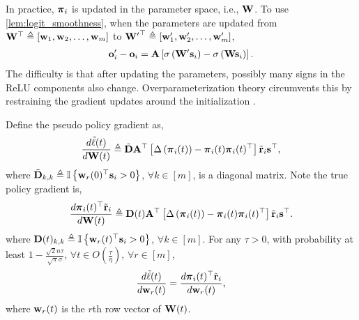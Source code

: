 In practice, ${\boldsymbol{\pi}}_i$ is updated in the parameter space, i.e., ${\mathbf{W}}$. To use \cref{lem:logit_smoothness}, when the parameters are updated from ${\mathbf{W}}^\top \triangleq \left[ {\mathbf{w}}_1, {\mathbf{w}}_2, \dots, {\mathbf{w}}_m \right]$ to ${{\mathbf{W}}^\prime}^\top \triangleq \left[ {\mathbf{w}}_1^\prime, {\mathbf{w}}_2^\prime, \dots, {\mathbf{w}}_m^\prime \right]$,
\begin{equation*}
\begin{split}
    {\mathbf{o}}_i^\prime - {\mathbf{o}}_i = {\mathbf{A}} \left[ \sigma \left( {\mathbf{W}}^\prime {\mathbf{s}}_i \right) - \sigma \left( {\mathbf{W}} {\mathbf{s}}_i \right) \right].
\end{split}
\end{equation*}
The difficulty is that after updating the parameters, possibly many signs in the ReLU components also change. Overparameterization theory circumvents this by restraining the gradient updates around the initialization \citep{li2018learning}.

\begin{lem}
\label{lem:gradient_coupling}
	Define the pseudo policy gradient as,
\begin{equation*}
\begin{split}
	\frac{d \tilde{\ell}(t)}{d {\mathbf{W}}(t)} \triangleq \tilde{{\mathbf{D}}} {\mathbf{A}}^\top \left[ \Delta\left( {\boldsymbol{\pi}}_i(t) \right) - {\boldsymbol{\pi}}_i(t) {\boldsymbol{\pi}}_i(t)^\top \right] {\tilde{\mathbf{r}}}_i {\mathbf{s}}^\top,
\end{split}
\end{equation*}
where $\tilde{{\mathbf{D}}}_{k,k} \triangleq {\mathbb{I}}\left\{ {\mathbf{w}}_r(0)^\top {\mathbf{s}}_i > 0 \right\}$, $\forall k \in [m]$, is a diagonal matrix. Note the true policy gradient is,
\begin{equation*}
\begin{split}
    \frac{d {\boldsymbol{\pi}}_i(t)^\top {\tilde{\mathbf{r}}}_i}{d {\mathbf{W}}(t)} \triangleq {\mathbf{D}}(t) {\mathbf{A}}^\top \left[ \Delta\left( {\boldsymbol{\pi}}_i(t) \right) - {\boldsymbol{\pi}}_i(t) {\boldsymbol{\pi}}_i(t)^\top \right] {\tilde{\mathbf{r}}}_i {\mathbf{s}}^\top.
\end{split}
\end{equation*}
where ${\mathbf{D}}(t)_{k,k} \triangleq {\mathbb{I}}\left\{ {\mathbf{w}}_r(t)^\top {\mathbf{s}}_i > 0 \right\}$, $\forall k \in [m]$. For any $\tau > 0$, with probability at least $1 - \frac{\sqrt{2}n\tau}{\sqrt{\pi}\sigma}$, $\forall t \in O\left(\frac{\tau}{\eta}\right)$, $\forall r \in [m]$,
\begin{equation*}
	\frac{d\tilde{\ell}(t)}{d {\mathbf{w}}_r(t)} = \frac{d {\boldsymbol{\pi}}_i(t)^\top {\tilde{\mathbf{r}}}_i}{d {\mathbf{w}}_r(t)},
\end{equation*}
where ${\mathbf{w}}_r(t)$ is the $r$th row vector of ${\mathbf{W}}(t)$.
\end{lem}

